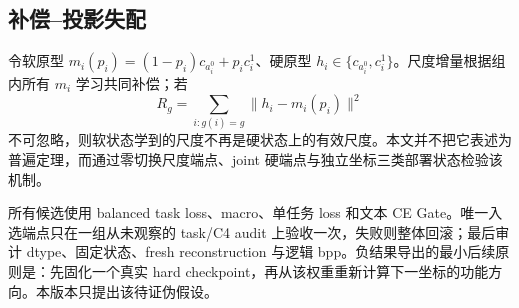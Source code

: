 \subsection{补偿--投影失配}
令软原型 $m_i(p_i)=(1-p_i)c_{a_i^0}+p_ic_i^1$、硬原型 $h_i\in\{c_{a_i^0},c_i^1\}$。尺度增量根据组内所有 $m_i$ 学习共同补偿；若
\begin{equation}
R_g=\sum_{i:g(i)=g}\|h_i-m_i(p_i)\|^2
\end{equation}
不可忽略，则软状态学到的尺度不再是硬状态上的有效尺度。本文并不把它表述为普遍定理，而通过零切换尺度端点、joint 硬端点与独立坐标三类部署状态检验该机制。

所有候选使用 balanced task loss、macro、单任务 loss 和文本 CE Gate。唯一入选端点只在一组从未观察的 task/C4 audit 上验收一次，失败则整体回滚；最后审计 dtype、固定状态、fresh reconstruction 与逻辑 bpp。负结果导出的最小后续原则是：先固化一个真实 hard checkpoint，再从该权重重新计算下一坐标的功能方向。本版本只提出该待证伪假设。
